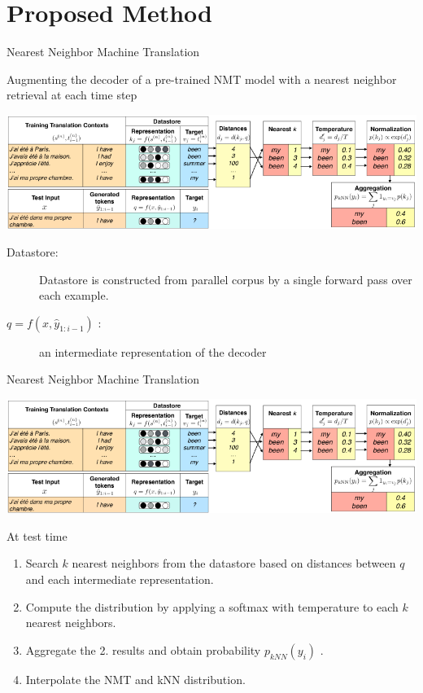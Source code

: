 \documentclass[unicode, 12pt, xdvipdfmx, aspectratio=169]{beamer}
\renewcommand{\baselinestretch}{1.2}
\begin{document}
\section{Proposed Method}
\label{sec:org4999f21}
\begin{frame}[label={sec:orge9985e4}]{Nearest Neighbor Machine Translation}
\begin{block}{Augmenting the decoder of a pre-trained NMT model with a nearest neighbor retrieval at each time step}
\begin{center}
\includegraphics[width=0.8\linewidth]{./figure/Figure1.pdf}
\end{center}
\vspace{-0.3cm}
\begin{description}
\item[{Datastore:}] Datastore is constructed from parallel corpus by a single forward pass over each example.
\item[{\(q = f(x, \hat{y}_{1:i-1})\) :}] an intermediate representation of the decoder
\end{description}
\end{block}
\end{frame}

\begin{frame}[label={sec:org882ee60}]{Nearest Neighbor Machine Translation}
\vspace{-0.2cm}
\begin{center}
\includegraphics[width=0.75\linewidth]{./figure/Figure1.pdf}
\end{center}
\renewcommand{\baselinestretch}{1.0}
\small
\vspace{-0.1cm}
\begin{block}{At test time}
\setlength{\parskip}{0.1em}
\begin{enumerate}
\item Search \(k\) nearest neighbors from the datastore based on distances between \(q\) and each intermediate representation.  \setlength{\itemsep}{0em}
\item Compute the distribution by applying a softmax with temperature to each \(k\) nearest neighbors.
\item Aggregate the 2. results and obtain probability \(p_{kNN}(y_i)\) .
\item Interpolate the NMT and kNN distribution.
\vspace{-0.3cm}
\end{enumerate}
\end{block}
\end{frame}
\end{document}
